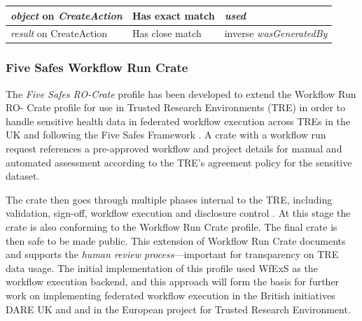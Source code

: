 \begin{table}[p]
\begin{tabular}{p{40mm}|p{50mm}|p{40mm}}
  \emph{object} on \emph{CreateAction} &
    Has exact match & 
    \emph{used} 
    \\ \hline
  \emph{result} on CreateAction & 
    Has close match & 
    inverse \emph{wasGeneratedBy} 
  
  \end{tabular}
  \label{ch54:rocrate_prov_mapping}
\end{table}
  

\subsubsection{Five Safes Workflow Run Crate}\label{ch54:trusted-workflow-run-crate}

The \emph{Five Safes RO-Crate} \cite{Soiland-Reyes 2023e} profile has been developed to extend the Workflow Run RO- Crate profile for use in Trusted Research Environments (TRE) in order to handle sensitive health data in federated workflow execution across TREs in the UK \cite{Giles 2023} and following the Five Safes Framework \cite{Desai 2016}.
A crate with a workflow run request references a pre-approved workflow and project details for manual and automated assessment according to the TRE's agreement policy for the sensitive dataset. 

The crate then goes through multiple phases internal to the TRE, including validation, sign-off, workflow execution and disclosure control \cite{Soiland-Reyes 2023f}.
At this stage the crate is also conforming to the Workflow Run Crate profile.
The final crate is then safe to be made public.
This extension of Workflow Run Crate documents and supports the \emph{human review process}---important for transparency on TRE data usage. 
The initial implementation of this profile used WfExS as the workflow execution backend, and this approach will form the basis for further work on implementing federated workflow execution in the British initiatives DARE UK and  \cite{Snowley 2023} and in the European  project for Trusted Research Environment.


